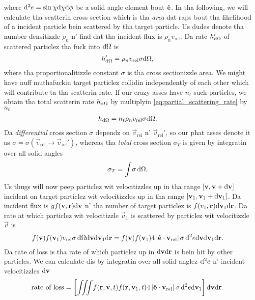 where $\mathrm{d}^2e = \sin\chi \mathrm{d}\chi \mathrm{d}\phi$ be a solid angle element bout $\hat {\mathbf{e}}$. In tha following, we will calculate tha scatterin cross section which is tha \textit{area} dat raps bout tha likelihood of a incident particle bein scattered by tha target particle. Us dudes denote tha number densitizzle $\rho_n$ n' find dat tha incident flux is $\rho_n v_\text{rel}$. Da rate $h_{\mathrm{d}\Omega}'$ of scattered particlez tha fuck into $\mathrm{d}\Omega$ is
\begin{align}
	\label{eq:partial_scattering_rate}
	h_{\mathrm{d}\Omega}' = \rho_n v_\text{rel}\sigma \mathrm{d}\Omega,
\end{align}
where tha proportionalitizzle constant $\sigma$ is tha cross sectionizzle area. We might have nuff muthafuckin target particlez collidin independently of each other which will contribute ta tha scatterin rate. If our crazy asses have $n_t$ such particles, we obtain tha total scatterin rate $h_{\mathrm{d}\Omega}$ by multiplyin \eqref{eq:partial_scattering_rate} by $n_t$
\begin{align}
	h_{\mathrm{d}\Omega} = n_t\rho_n v_\text{rel}\sigma \mathrm{d}\Omega.
\end{align}
Da \textit{differential} cross section $\sigma$ dependz on $\vec v_\text{rel}$ n' $\vec v_\text{rel}'$, so our phat asses denote it as $\sigma = \sigma(\vec v_\text{rel}\rightarrow \vec v_\text{rel}')$, whereas tha \textit{total} cross section $\sigma_T$ is given by integratin over all solid angles
\begin{align}
	\sigma_T = \int\! \sigma \, \mathrm{d}\Omega.
\end{align}
Us thugs will now peep particlez wit velocitizzles up in tha range $[\mathbf v, \mathbf v + \mathrm{d}\mathbf v]$ incident on target particlez wit velocitizzles up in tha range $[\mathbf v_1, \mathbf v_1 + \mathrm{d}\mathbf v_1]$. Da incident flux is $gf(\mathbf v,\mathbf r)\mathrm{d}\mathbf v$ n' tha number of target particlez is $f(v_1,\mathbf r)\mathrm{d}\mathbf v_1\mathrm{d}\mathbf r$. Da rate at which particlez wit velocitizzle $\vec v_1$ is scattered by particlez wit velocitizzle $\vec v$ is 
\begin{align}
	f(\mathbf v)f(\mathbf v_1) v_\text{rel} \sigma \, \mathrm{d}\Omega \mathrm{d}\mathbf v \mathrm{d}\mathbf v_1 \mathrm{d}\mathbf r = f(\mathbf v)f(\mathbf v_1)4\left|\hat {\mathbf{e}}\cdot \mathbf v_\text{rel}\right| \sigma \,\mathrm{d}^2e \mathrm{d}\mathbf v \mathrm{d}\mathbf v_1 \mathrm{d}\mathbf r.
\end{align}
Da rate of loss is tha rate of which particlez up in $\mathrm{d}\mathbf v\mathrm{d}\mathbf r$ is bein hit by other particles. We can calculate dis by integratin over all solid anglez $\mathrm{d}^2 e$ n' incident velocitizzles $\mathrm{d}\mathbf v$
\begin{align}
	\text{rate of loss} = \left[\iiint\! f(\mathbf r, \mathbf v, t)f(\mathbf r, \mathbf v_1, t)4\left|\hat {\mathbf{e}} \cdot \mathbf v_\text{rel} \right|\sigma \,\mathrm{d}^2 e\mathrm{d}\mathbf v_1\right]\mathrm{d}\mathbf v\mathrm{d}\mathbf r.
\end{align}
